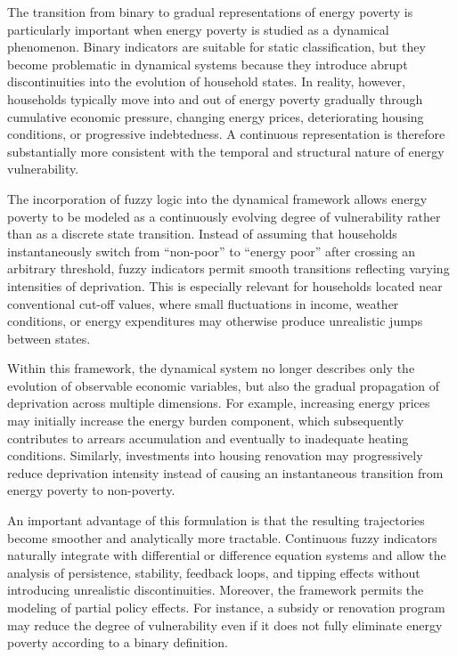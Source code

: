 \documentclass[11pt,a4paper]{article}
\begin{document}
The transition from binary to gradual representations of energy poverty is particularly important when energy poverty is studied as a dynamical phenomenon. Binary indicators are suitable for static classification, but they become problematic in dynamical systems because they introduce abrupt discontinuities into the evolution of household states. In reality, however, households typically move into and out of energy poverty gradually through cumulative economic pressure, changing energy prices, deteriorating housing conditions, or progressive indebtedness. A continuous representation is therefore substantially more consistent with the temporal and structural nature of energy vulnerability.

The incorporation of fuzzy logic into the dynamical framework allows energy poverty to be modeled as a continuously evolving degree of vulnerability rather than as a discrete state transition. Instead of assuming that households instantaneously switch from ``non-poor'' to ``energy poor'' after crossing an arbitrary threshold, fuzzy indicators permit smooth transitions reflecting varying intensities of deprivation. This is especially relevant for households located near conventional cut-off values, where small fluctuations in income, weather conditions, or energy expenditures may otherwise produce unrealistic jumps between states.

Within this framework, the dynamical system no longer describes only the evolution of observable economic variables, but also the gradual propagation of deprivation across multiple dimensions. For example, increasing energy prices may initially increase the energy burden component, which subsequently contributes to arrears accumulation and eventually to inadequate heating conditions. Similarly, investments into housing renovation may progressively reduce deprivation intensity instead of causing an instantaneous transition from energy poverty to non-poverty.

An important advantage of this formulation is that the resulting trajectories become smoother and analytically more tractable. Continuous fuzzy indicators naturally integrate with differential or difference equation systems and allow the analysis of persistence, stability, feedback loops, and tipping effects without introducing unrealistic discontinuities. Moreover, the framework permits the modeling of partial policy effects. For instance, a subsidy or renovation program may reduce the degree of vulnerability even if it does not fully eliminate energy poverty according to a binary definition.
\end{document}
